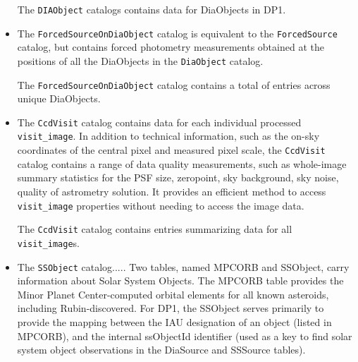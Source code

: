 \begin{itemize}
The \texttt{DIAObject} catalogs contains data for \ndiaobjects DiaObjects in \gls{DP1}.


\item The \texttt{ForcedSourceOnDiaObject} catalog is equivalent to the \texttt{ForcedSource} catalog, but contains \gls{forced photometry} measurements obtained at the positions of all the DiaObjects in the \texttt{DiaObject} catalog.

The \texttt{ForcedSourceOnDiaObject} catalog  contains a total of \ndiaforcedsources entries across \ndiaforcedobjects unique DiaObjects.


\item The \texttt{CcdVisit} catalog contains data for each individual processed \texttt{visit\_image}.
In addition to technical information, such as the on-sky coordinates of the central pixel and measured pixel scale, the \texttt{CcdVisit} catalog contains a range of data quality measurements, such as whole-image summary statistics for the \gls{PSF} size, zeropoint, sky \gls{background}, sky noise, quality of \gls{astrometry} solution.
It provides an efficient method to access  \texttt{visit\_image} properties without needing to access the image data.

The \texttt{CcdVisit} catalog contains entries summarizing data for all \nvisitdetectorsummaries \texttt{visit\_image}s.

\item The \texttt{SSObject} catalog..... Two tables, named \gls{MPCORB} and SSObject, carry information about Solar System Objects. The \gls{MPCORB} table provides the Minor Planet \gls{Center}-computed orbital elements for all known asteroids, including Rubin-discovered. For DP1, the SSObject serves primarily to provide the mapping between the \gls{IAU} designation of an object (listed in \gls{MPCORB}), and the internal ssObjectId identifier (used as a key to find solar system object observations in the DiaSource and SSSource tables).


\end{itemize}
